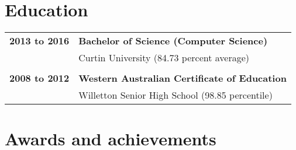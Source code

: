 \documentclass[a4paper,12pt]{article}
\begin{document}


\newpage

\section*{Education}

\begin{tabular}{p{35mm}p{125mm}}
	                    \textbf{2013 to 2016}       & \textbf{Bachelor of Science (Computer Science)}
	\vspace{0.2em}  \\                              & Curtin University (84.73 percent average)
	\\              \\  \textbf{2008 to 2012}       & \textbf{Western Australian Certificate of Education}
	\vspace{0.2em}  \\                              & Willetton Senior High School (98.85 percentile)
\end{tabular}

\section*{Awards and achievements}
\end{document}
